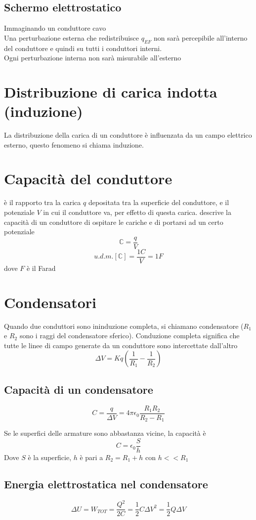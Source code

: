 \documentclass[a4paper]{report}
\begin{document}
  \subsection{Schermo elettrostatico}
  Immaginando un conduttore cavo\\
  Una perturbazione esterna che redistribuisce $q_{EF}$ non sarà percepibile all'interno del conduttore e quindi su tutti i conduttori interni.\\
  Ogni perturbazione interna non sarà misurabile all'esterno

  \section{Distribuzione di carica indotta (induzione)}
  La distribuzione della carica di un conduttore è influenzata da un campo elettrico esterno, questo fenomeno si chiama induzione.

  \section{Capacità del conduttore}
  è il rapporto tra la carica $q$ depositata tra la superficie del conduttore, e il potenziale $V$ in cui il conduttore va, per effetto di questa carica. descrive la capacità di un conduttore di ospitare le cariche e di portarsi ad un certo potenziale
  $$ \mathbb{C} = \frac{q}{V} $$
  $$u.d.m.[\mathbb{C}] = \frac{1C}{V} = 1F$$
  dove $ F $ è il Farad

  \section{Condensatori}
  Quando due conduttori sono ininduzione completa, si chiamano condensatore ($R_1$ e $R_2$ sono i raggi del condensatore sferico). Conduzione completa significa che tutte le linee di campo generate da un conduttore sono intercettate dall'altro
  $$ \Delta V = Kq (\frac{1}{R_1} - \frac{1}{R_2}) $$

  \subsection{Capacità di un condensatore}
  $$ C= \frac{q}{\Delta V} = 4 \pi \epsilon_0 \frac{R_1 R_2}{R_2 - R_1} $$

  Se le superfici delle armature sono abbastanza vicine, la capacità è
  $$C = \epsilon_0 \frac{S}{h}$$
  Dove $S$ è la superficie, $h$ è pari a $R_2 = R_1 + h$ con $h<<R_1$

  \subsection{Energia elettrostatica nel condensatore}
  $$ \Delta U = W_{TOT} = \frac{Q^2}{2C} = \frac{1}{2} C \Delta V^2 = \frac{1}{2} Q \Delta V $$
\end{document}
